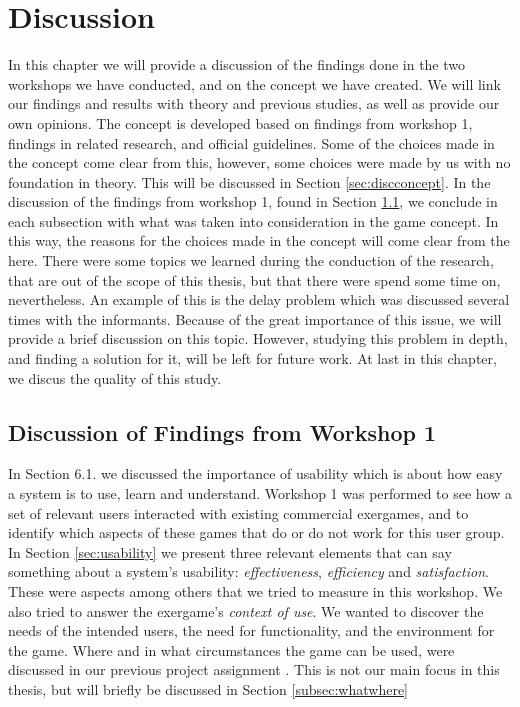 \chapter{Discussion}
\label{chap:discussion}

In this chapter we will provide a discussion of the findings done in the two workshops we have conducted, and on the concept we have created. We will link our findings and results with theory and previous studies, as well as provide our own opinions. The concept is developed based on findings from workshop 1, findings in related research, and official guidelines. Some of the choices made in the concept come clear from this, however, some choices were made by us with no foundation in theory. This will be discussed in Section \ref{sec:discconcept}. In the discussion of the findings from workshop 1, found in Section \ref{sec:discfindings1}, we conclude in each subsection with what was taken into consideration in the game concept. In this way, the reasons for the choices made in the concept will come clear from the here. There were some topics we learned during the conduction of the research, that are out of the scope of this thesis, but that there were spend some time on, nevertheless. An example of this is the delay problem which was discussed several times with the informants. Because of the great importance of this issue, we will provide a brief discussion on this topic. However, studying this problem in depth, and finding a solution for it, will be left for future work. At last in this chapter, we discus the quality of this study.

\section{Discussion of Findings from Workshop 1}
\label{sec:discfindings1}

In Section 6.1. we discussed the importance of usability which is about how easy a system is to use, learn and understand. Workshop 1 was performed to see how a set of relevant users interacted with existing commercial exergames, and to identify which aspects of these games that do or do not work for this user group. In Section \ref{sec:usability} we present three relevant elements that can say something about a system's usability: \emph{effectiveness}, \emph{efficiency}  and \emph{satisfaction}. These were aspects among others that we tried to measure in this workshop. We also tried to answer the exergame's \emph{context of use}. We wanted to discover the needs of the intended users, the need for functionality, and the environment for the game. Where and in what circumstances the game can be used, were discussed in our previous project assignment \cite{project}. This is not our main focus in this thesis, but will briefly be discussed in Section \ref{subsec:whatwhere} 

